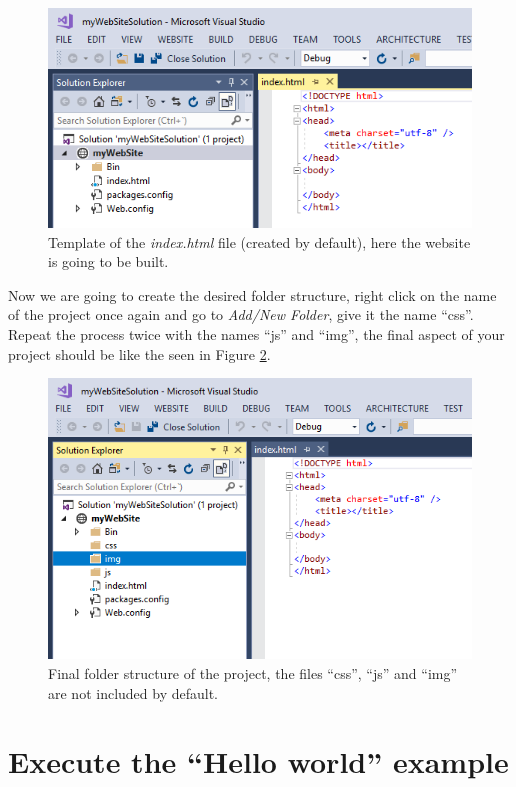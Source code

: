 \begin{figure}
    \centering
    \includegraphics[width= 0.9 \textwidth]{Figures/Projects/pro4b}
    \caption{Template of the \textit{index.html} file (created by default), here the website is going to be built.}
    \label{fig:pro4b}
\end{figure}

\newpage
Now we are going to create the desired folder structure, right click on the name of the project once again and go to \textit{Add/New Folder}, give it the name ``css''. Repeat the process twice with the names ``js'' and ``img'', the final aspect of your project should be like the seen in Figure \ref{fig:pro5}.

\begin{figure}
    \centering
    \includegraphics[width= 0.8 \textwidth]{Figures/Projects/pro5}
    \caption{Final folder structure of the project, the files ``css'', ``js'' and ``img'' are not included by default.}
    \label{fig:pro5}
\end{figure}




    \FloatBarrier
    \section{Execute the ``Hello world'' example} \label{sec:Web}

